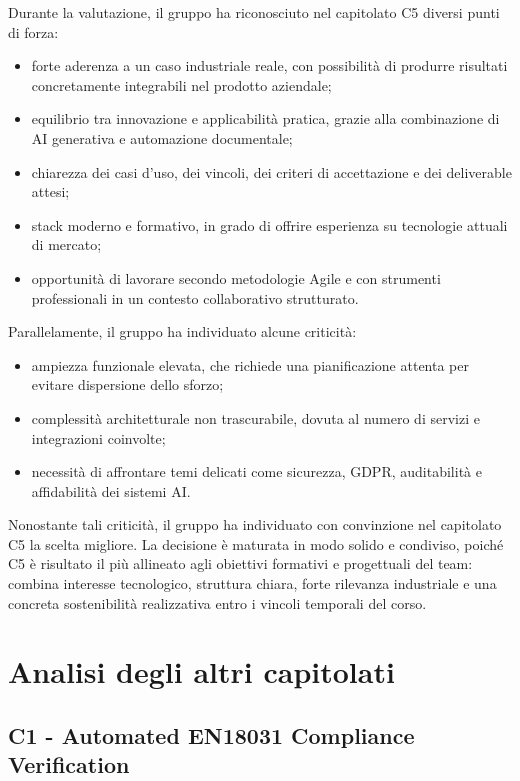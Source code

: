 \documentclass[a4paper,12pt]{article}
\begin{document}
Durante la valutazione, il gruppo ha riconosciuto nel capitolato C5 diversi punti di forza:

\begin{itemize}
    \item forte aderenza a un caso industriale reale, con possibilità di produrre risultati concretamente integrabili nel prodotto aziendale;
    \item equilibrio tra innovazione e applicabilità pratica, grazie alla combinazione di AI generativa e automazione documentale;
    \item chiarezza dei casi d'uso, dei vincoli, dei criteri di accettazione e dei deliverable attesi;
    \item stack moderno e formativo, in grado di offrire esperienza su tecnologie attuali di mercato;
    \item opportunità di lavorare secondo metodologie Agile e con strumenti professionali in un contesto collaborativo strutturato.
\end{itemize}

Parallelamente, il gruppo ha individuato alcune criticità:

\begin{itemize}
    \item ampiezza funzionale elevata, che richiede una pianificazione attenta per evitare dispersione dello sforzo;
    \item complessità architetturale non trascurabile, dovuta al numero di servizi e integrazioni coinvolte;
    \item necessità di affrontare temi delicati come sicurezza, GDPR, auditabilità e affidabilità dei sistemi AI.
\end{itemize}

Nonostante tali criticità, il gruppo ha individuato con convinzione nel capitolato C5 la scelta migliore. La decisione è maturata in modo solido e condiviso, poiché C5 è risultato il più allineato agli obiettivi formativi e progettuali del team: combina interesse tecnologico, struttura chiara, forte rilevanza industriale e una concreta sostenibilità realizzativa entro i vincoli temporali del corso.

\section{Analisi degli altri capitolati}
\subsection{C1 - Automated EN18031 Compliance Verification}
\end{document}
